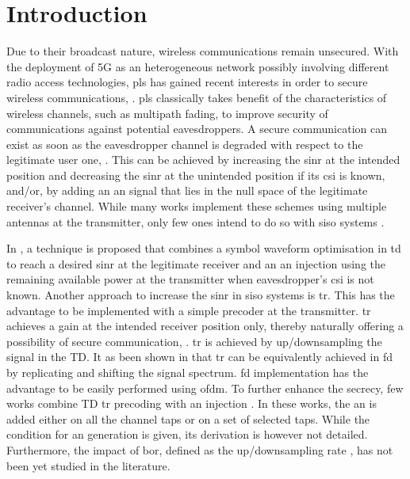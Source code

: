 \section{Introduction}

Due to their broadcast nature, wireless communications remain unsecured. With the  deployment of 5G as an heterogeneous network possibly involving different radio access technologies, \gls{pls} has gained recent interests in order to secure wireless communications, \cite{PLS_litt1,PLS_litt2,PLS_litt3}. \gls{pls} classically takes benefit of the characteristics of wireless channels, such as multipath fading, to improve security of communications against potential eavesdroppers. A secure communication can exist as soon as the eavesdropper channel is degraded with respect to the legitimate user one, \cite{wyner}. This can be achieved by increasing the \gls{sinr} at the intended position and decreasing the \gls{sinr} at the unintended position if its \gls{csi} is known, and/or, by adding an \gls{an} signal that lies in the null space of the legitimate receiver's channel. While many works implement these schemes using multiple antennas at the transmitter, only few ones intend to do so with \gls{siso} systems \cite{PLS_litt4,TR_FD_TD,TR_AN_2018_xu,TR_AN_2017_Li,TR_AN_2018_Li}.

In \cite{PLS_litt4}, a technique is proposed that combines a symbol waveform optimisation in \gls{td} to reach a desired \gls{sinr} at the legitimate receiver and an \gls{an} injection using the remaining available power at the transmitter when eavesdropper's \gls{csi} is not known. Another approach to increase the \gls{sinr} in \gls{siso} systems is \gls{tr}. This has the advantage to be implemented with a simple precoder at the transmitter. \gls{tr} achieves a gain at the intended receiver position only, thereby naturally offering a possibility of secure communication, \cite{otges}. \gls{tr} is achieved by up/downsampling the signal in the TD. It as been shown in  \cite{TR_FD_TD} that \gls{tr} can be equivalently achieved in \gls{fd} by replicating and shifting the signal spectrum. \gls{fd} implementation has the advantage to be easily performed using \gls{ofdm}. To further enhance the secrecy, few works combine TD \gls{tr} precoding with \gls{an} injection \cite{TR_AN_2018_xu,TR_AN_2017_Li,TR_AN_2018_Li}. In these works, the \gls{an} is added either on all the channel taps or on a set of selected taps. While the condition for \gls{an} generation is given, its derivation is however not detailed. Furthermore, the impact of \gls{bor}, defined as the up/downsampling rate \cite{TR_bor}, has not been yet studied in the literature. 

